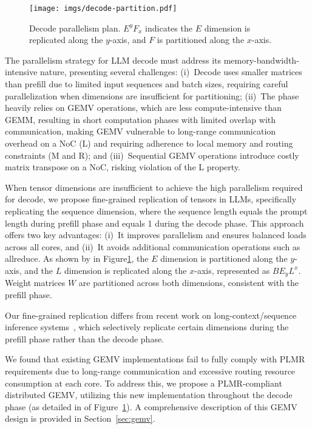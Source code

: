 \begin{figure}[t!]
    \centering
    \texttt{[image: imgs/decode-partition.pdf]}
    \vspace{-2mm}
    \caption{Decode parallelism plan. $E^yF_x$ indicates the $E$ dimension is replicated along the $y$-axis, and $F$ is partitioned along the $x$-axis.}
    \vspace{-5mm}
    \label{fig:decode-partition}
\end{figure}

The parallelism strategy for LLM decode must address its memory-bandwidth-intensive nature, presenting several challenges: (i)~Decode uses smaller matrices than prefill due to limited input sequences and batch sizes, requiring careful parallelization when dimensions are insufficient for partitioning; (ii)~The phase heavily relies on GEMV operations, which are less compute-intensive than GEMM, resulting in short computation phases with limited overlap with communication, making GEMV vulnerable to long-range communication overhead on a NoC (L) and requiring adherence to local memory and routing constraints (M and R); and (iii)~Sequential GEMV operations introduce costly matrix transpose on a NoC, risking violation of the L property.

 When tensor dimensions are insufficient to achieve the high parallelism required for decode, we propose fine-grained replication of tensors in LLMs, specifically replicating the sequence dimension, where the sequence length equals the prompt length during prefill phase and equals 1 during the decode phase. This approach offers two key advantages: (i)~It improves parallelism and ensures balanced loads across all cores, and (ii)~It avoids additional communication operations such as allreduce. As shown by  in Figure\ref{fig:decode-partition}, the $E$ dimension is partitioned along the $y$-axis, and the $L$ dimension is replicated along the $x$-axis, represented as $BE_yL^x$. Weight matrices $W$ are partitioned across both dimensions, consistent with the prefill phase.

Our fine-grained replication differs from recent work on long-context/sequence inference systems~\cite{loongserve, distserve}, which selectively replicate certain dimensions during the prefill phase rather than the decode phase.

 We found that existing GEMV implementations fail to fully comply with PLMR requirements due to long-range communication and excessive routing resource consumption at each core. To address this, we propose a PLMR-compliant distributed GEMV, utilizing this new implementation throughout the decode phase (as detailed in  of Figure~\ref{fig:decode-partition}). A comprehensive description of this GEMV design is provided in Section~\ref{sec:gemv}.

